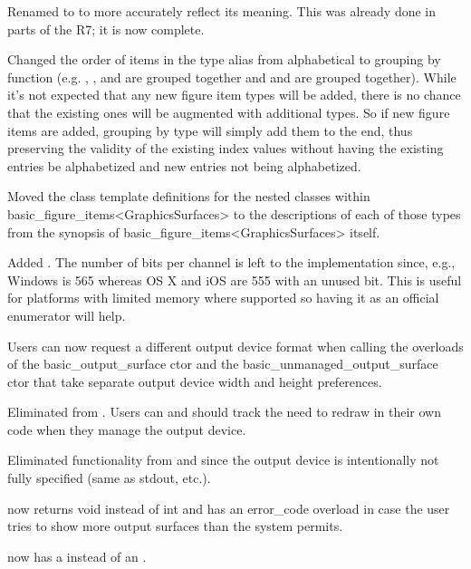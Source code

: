 \pnum
Renamed  to  to more accurately reflect its meaning. This was already done in parts of the R7; it is now complete.

\pnum
Changed the order of items in the  type alias from alphabetical to grouping by function (e.g. , , and  are grouped together and  and  are grouped together). While it's not expected that any new figure item types will be added, there is no chance that the existing ones will be augmented with additional types. So if new figure items are added, grouping by type will simply add them to the end, thus preserving the validity of the existing index values without having the existing entries be alphabetized and new entries not being alphabetized.

\pnum
Moved the class template definitions for the nested classes within basic_figure_items<GraphicsSurfaces> to the descriptions of each of those types from the synopsis of basic_figure_items<GraphicsSurfaces> itself.

\pnum
Added . The number of bits per channel is left to the implementation since, e.g., Windows\textregistered{} is 565 whereas OS X\textregistered{} and iOS\textregistered{} are 555 with an unused bit. This is useful for platforms with limited memory where supported so having it as an official enumerator will help. 

\pnum
Users can now request a different output device format when calling the overloads of the basic_output_surface ctor and the basic_unmanaged_output_surface ctor that take separate output device width and height preferences.

\pnum
Eliminated  from . Users can and should track the need to redraw in their own code when they manage the output device.

\pnum
Eliminated  functionality from  and  since the output device is intentionally not fully specified (same as stdout, etc.).

\pnum
{} now returns void instead of int and has an error_code overload in case the user tries to show more output surfaces than the system permits.

\pnum
{} now has a  instead of an .

